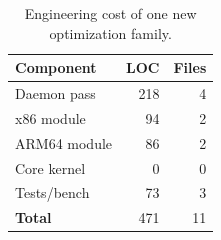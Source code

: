 \begin{table}[t]
  \centering
  \caption{Engineering cost of one new optimization family. }
  \label{tab:rq5-cost}
  \footnotesize
  \begin{tabular}{p{2.2cm}rr}
    \toprule
    Component & LOC & Files \\
    \midrule
    Daemon pass & 218 & 4 \\
    x86 module & 94 & 2 \\
    ARM64 module & 86 & 2 \\
    Core kernel & 0 & 0 \\
    Tests/bench & 73 & 3 \\
    \textbf{Total} & 471 & 11 \\
    \bottomrule
  \end{tabular}
\end{table}
